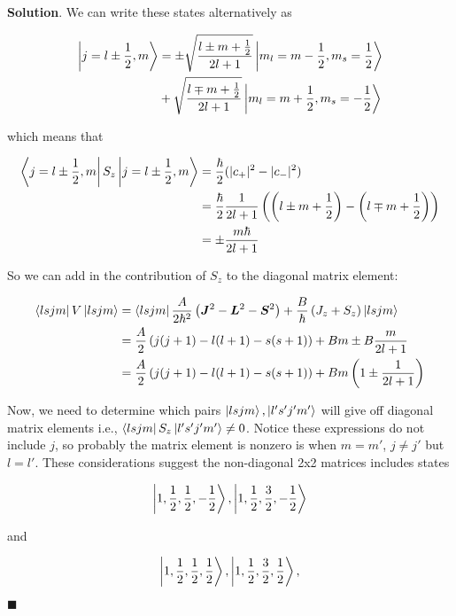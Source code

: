\documentclass[12pt]{article}
\theoremstyle{definition}
\newenvironment{s}{%
        \begin{trivlist} \item \textbf{Solution}. }{%
            \hspace*{\fill} $\blacksquare$\end{trivlist}}%
\begin{document}
{\begin{s}
We can write these states alternatively as

\begin{align*}
\ket{j=l\pm \frac{1}{2},m} &= \pm\sqrt{\frac{l\pm m +\frac{1}{2}}{2l+1}}\ket{m_{l} = m-\frac{1}{2}, m_{s}=\frac{1}{2}} \\
&+ \sqrt{\frac{l\mp m +\frac{1}{2}}{2l+1}}\ket{m_{l} = m+\frac{1}{2}, m_{s}=-\frac{1}{2}}
\end{align*} 

which means that

\begin{align*}
\bra{j=l\pm \frac{1}{2},m}S_{z}\ket{j=l\pm \frac{1}{2},m} &= \frac{\hbar}{2}(|c_{+}|^{2}-|c_{-}|^{2})\\
&= \frac{\hbar}{2}\frac{1}{2l+1}\left(\left(l\pm m+\frac{1}{2}\right)-\left(l\mp m+\frac{1}{2}\right)\right) \\
&= \pm \frac{m\hbar}{2l+1}
\end{align*} 

So we can add in the contribution of $S_z$ to the diagonal matrix element:

\begin{align*}
\bra{lsjm}V\ket{lsjm} &= \bra{lsjm}\frac{A}{2\hbar^{2}}\left(\bm{J}^{2}-\bm{L}^{2}-\bm{S}^{2}\right) + \frac{B}{\hbar}\left(J_z + S_z\right)\ket{lsjm}\\
&= \frac{A}{2}\left(j(j+1)-l(l+1)-s(s+1)\right) + Bm \pm B\frac{m}{2l+1}\\
&= \frac{A}{2}\left(j(j+1)-l(l+1)-s(s+1)\right) + Bm\left(1 \pm \frac{1}{2l+1}\right)\\
\end{align*} 

Now, we need to determine which pairs $\ket{lsjm},\ket{l's'j'm'}$ will give off diagonal matrix elements i.e., $\bra{lsjm}S_{z}\ket{l's'j'm'} \neq 0$. Notice these expressions do not include $j$, so probably the matrix element is nonzero is when $m= m'$, $j\neq j'$ but $l=l'$. These considerations suggest the non-diagonal 2x2 matrices includes states

\begin{align*}
\ket{1, \frac{1}{2}, \frac{1}{2}, -\frac{1}{2}},
\ket{1, \frac{1}{2}, \frac{3}{2}, -\frac{1}{2}}
\end{align*} 

and 

\begin{align*}
\ket{1, \frac{1}{2}, \frac{1}{2}, \frac{1}{2}},
\ket{1, \frac{1}{2}, \frac{3}{2}, \frac{1}{2}},
\end{align*} 


\end{s}}
\end{document}
